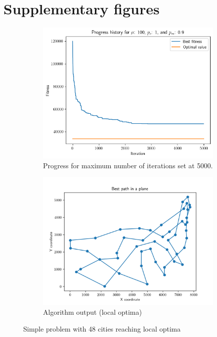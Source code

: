 \documentclass[10pt,a4paper]{article}
\begin{document}
\section*{Supplementary figures}
\begin{figure}[h!]
    \centering
    \begin{subfigure}[b]{0.45\textwidth}
        \centering
        \includegraphics[width=\textwidth]{../figures/48output.png}
        \caption{Progress for maximum number of iterations set at 5000.}
        \label{fig:progress16}
    \end{subfigure}
    \hfil
    \begin{subfigure}[b]{0.45\textwidth}
        \centering
        \includegraphics[width=\textwidth]{../figures/48path1.png}
        \caption{Algorithm output (local optima)}
        \label{fig:output16}
    \end{subfigure}
    \caption{Simple problem with 48 cities reaching local optima}
    \label{fig:problem16}
\end{figure}
\printbibliography
\end{document}
